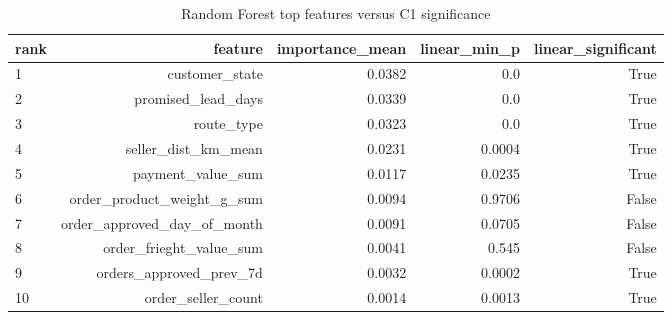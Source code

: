 \begin{table}[htbp]
\centering
\small
\caption{Random Forest top features versus C1 significance}
\begin{tabular}{lrrrr}
\toprule
rank & feature & importance\_mean & linear\_min\_p & linear\_significant \\
\midrule
1 & customer\_state & 0.0382 & 0.0 & True \\
2 & promised\_lead\_days & 0.0339 & 0.0 & True \\
3 & route\_type & 0.0323 & 0.0 & True \\
4 & seller\_dist\_km\_mean & 0.0231 & 0.0004 & True \\
5 & payment\_value\_sum & 0.0117 & 0.0235 & True \\
6 & order\_product\_weight\_g\_sum & 0.0094 & 0.9706 & False \\
7 & order\_approved\_day\_of\_month & 0.0091 & 0.0705 & False \\
8 & order\_frieght\_value\_sum & 0.0041 & 0.545 & False \\
9 & orders\_approved\_prev\_7d & 0.0032 & 0.0002 & True \\
10 & order\_seller\_count & 0.0014 & 0.0013 & True \\
\bottomrule
\end{tabular}
\par\smallskip\begin{minipage}{\linewidth}\footnotesize \end{minipage}
\end{table}

